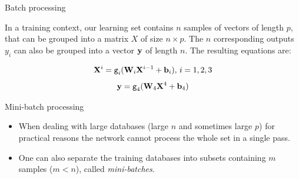 \documentclass[xcolor=pdftex,dvipsnames,table,mathserif]{beamer}
\begin{document}

\begin{frame}{Batch processing}

  In a training context, our learning set contains $n$ samples of vectors of length $p$, that can be grouped into a matrix $X$ of size $n \times p$. The $n$ corresponding outputs $y_i$ can also be grouped into a vector $\mathbf{y}$ of length $n$. The resulting equations are:

  \begin{block}{}
    \[\mathbf{X}^i = \texttt{g}_i(\mathbf{W}_i\mathbf{X}^{i-1} + \mathbf{b}_i),\, i= 1, 2, 3 \]
    \[\mathbf{y} = \texttt{g}_4(\mathbf{W}_4\mathbf{X}^4 + \mathbf{b}_4)\]
  \end{block}


\end{frame}

\begin{frame}{Mini-batch processing}

  \begin{itemize}[<+->]
  \item   When dealing with large databases (large $n$ and sometimes large $p$) for practical reasons the network cannot process the whole set in a single pass.
  \item   One can also separate the training databases into subsets containing $m$ samples ($m < n$), called \emph{mini-batches}.
  \end{itemize}


\end{frame}
\end{document}
